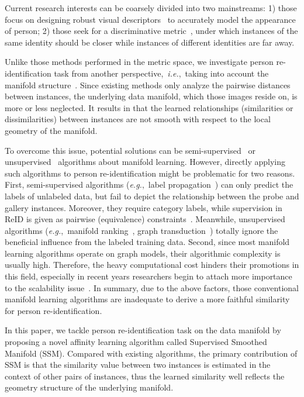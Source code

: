 \documentclass[10pt,twocolumn,letterpaper]{article}
\def\eg{\emph{e.g.}}
\def\ie{\emph{i.e.}}
\begin{document}
Current research interests can be coarsely divided into two mainstreams: 1) those focus on designing robust visual descriptors~\cite{SCNCD,symmetry,GOG,XQDA,zheng2015query} to accurately model the appearance of person; 2) those seek for a discriminative metric~\cite{PRDC,li2013decision,xiong2014person,lisanti2015person,hirzer2012relaxed}, under which instances of the same identity should be closer while instances of different identities are far away.

Unlike those methods performed in the metric space, we investigate person re-identification task from another perspective,~\ie,~taking into account the manifold structure~\cite{LLE}. Since existing methods only analyze the pairwise distances between instances, the underlying data manifold, which those images reside on, is more or less neglected.
It results in that the learned relationships (similarities or dissimilarities) between instances are not smooth with respect to the local geometry of the manifold.

To overcome this issue, potential solutions can be semi-supervised~\cite{LP,LGC} or unsupervised~\cite{zhou2004ranking,zhang2015query,donoser2013diffusion,RDP_AAAI} algorithms about manifold learning. However, directly applying such algorithms to person re-identification might be problematic for two reasons.
First, semi-supervised algorithms (\eg,~label propagation~\cite{LP}) can only predict the labels of unlabeled data, but fail to depict the relationship between the probe and gallery instances. Moreover, they require category labels, while supervision in ReID is given as pairwise (equivalence) constraints~\cite{KISSME}. Meanwhile, unsupervised algorithms (\eg,~manifold ranking~\cite{zhou2004ranking}, graph transduction~\cite{GT}) totally ignore the beneficial influence from the labeled training data.
Second, since most manifold learning algorithms operate on graph models, their algorithmic complexity is usually high. Therefore, the heavy computational cost hinders their promotions in this field, especially in recent years researchers begin to attach more importance to the scalability issue~\cite{Deepreid,market1501}. In summary, due to the above factors, those conventional manifold learning algorithms are inadequate to derive a more faithful similarity for person re-identification.

In this paper, we tackle person re-identification task on the data manifold by proposing a novel affinity learning algorithm called Supervised Smoothed Manifold (SSM).
Compared with existing algorithms, the primary contribution of SSM is that the similarity value between two instances is estimated in the context of other pairs of instances, thus the learned similarity well reflects the geometry structure of the underlying manifold.
\end{document}
